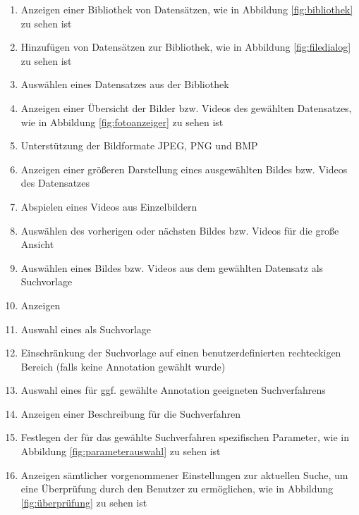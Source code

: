 \begin{enumerate} [label=\bfseries /F \arabic*0/, leftmargin=*]
	\item Anzeigen einer Bibliothek von Datensätzen, wie in Abbildung \ref{fig:bibliothek} zu sehen ist \label{f:bibliothek_anzeigen}
	\item Hinzufügen von Datensätzen zur Bibliothek, wie in Abbildung \ref{fig:filedialog} zu sehen ist \label{f:datensatz_hinzufuegen}
	\item Ausw\"ahlen eines Datensatzes aus der Bibliothek \label{f:auswahl_eines_datensatzes}
	\item Anzeigen einer Übersicht der Bilder bzw. Videos des gewählten Datensatzes, wie in Abbildung \ref{fig:fotoanzeiger} zu sehen ist \label{f:uebersicht_anzeigen}
	\item Unterstützung der Bildformate JPEG, PNG und BMP
	\item Anzeigen einer größeren Darstellung eines ausgewählten Bildes bzw. Videos des Datensatzes \label{f:anzeigen_groessere_darstellung}
	\item Abspielen eines Videos aus Einzelbildern \label{f:video_abspielen}
	\item Auswählen des vorherigen oder nächsten Bildes bzw. Videos für die große Ansicht \label{f:vorheriges_naechstes}
	\item Ausw\"ahlen eines Bildes bzw. Videos aus dem gewählten Datensatz als Suchvorlage \label{f:bildauswahl}
	\item Anzeigen  \label{f:annotation_anzeigen}
	\item Auswahl eines  als Suchvorlage \label{f:annotation_auswaehlen}
	\item Einschränkung der Suchvorlage auf einen benutzerdefinierten rechteckigen Bereich (falls keine \gls{Annotation} gewählt wurde) \label{f:bereich_auswaehlen}
	\item Auswahl eines für ggf. gewählte \gls{Annotation} geeigneten Suchverfahrens \label{f:auswahl_suchverfahren}
	\item Anzeigen einer Beschreibung für die Suchverfahren \label{f:beschreibung_suchverfahren}
	\item Festlegen der für das gewählte Suchverfahren spezifischen Parameter, wie in Abbildung \ref{fig:parameterauswahl} zu sehen ist \label{f:parameterwahl}
	\item Anzeigen sämtlicher vorgenommener Einstellungen zur aktuellen Suche, um eine Überprüfung durch den Benutzer zu ermöglichen, wie in Abbildung \ref{fig:überprüfung} zu sehen ist \label{f:ueberpruefung}

\end{enumerate}
